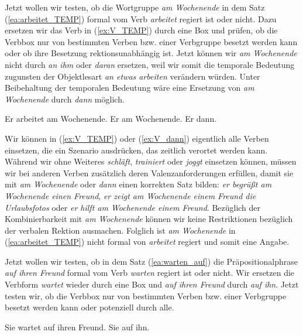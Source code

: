 Jetzt wollen wir testen, ob die Wortgruppe \textit{am Wochenende} in dem Satz (\ref{ea:arbeitet_TEMP}) formal vom Verb \textit{arbeitet} regiert ist oder nicht. Dazu ersetzen wir das Verb in (\ref{ex:V_TEMP}) durch eine Box und prüfen, ob die Verbbox nur von bestimmten Verben bzw. einer Verbgruppe besetzt werden kann oder ob ihre Besetzung rektionsunabhängig ist. Jetzt können wir \textit{am Wochenende} nicht durch \textit{an ihm} oder \textit{daran} ersetzen, weil wir somit die temporale Bedeutung zugunsten der Objektlesart \textit{an etwas arbeiten} verändern würden. Unter Beibehaltung der temporalen Bedeutung wäre eine Ersetzung von \textit{am Wochenende} durch \textit{dann} möglich. 

\ea \label{ea:Subkategorisierungstest2}
\ea \label{ea:arbeitet_TEMP} Er arbeitet am Wochenende.
\ex \label{ex:V_TEMP} Er \fbox{\phantom{arbeitet}} am Wochenende.
\ex \label{ex:V_dann} Er \fbox{\phantom{arbeitet}} dann.
\z 
\z   

Wir können in (\ref{ex:V_TEMP}) oder (\ref{ex:V_dann}) eigentlich alle Verben einsetzen, die ein Szenario ausdrücken, das zeitlich verortet werden kann. Während wir ohne Weiteres \zB \textit{schläft}, \textit{trainiert} oder \textit{joggt} einsetzen können, müssen wir bei anderen Verben zusätzlich deren Valenzanforderungen erfüllen, damit sie mit \textit{am Wochenende} oder \textit{dann} einen korrekten Satz bilden: \zB \textit{er begrüßt am Wochenende einen Freund}, \textit{er zeigt am Wochenende einem Freund die Urlaubsfotos} oder \textit{er hilft am Wochenende einem Freund}. Bezüglich der Kombinierbarkeit mit \textit{am Wochenende} können wir keine Restriktionen bezüglich der verbalen Rektion ausmachen. Folglich ist \textit{am Wochenende} in (\ref{ea:arbeitet_TEMP}) nicht formal von \textit{arbeitet} regiert und somit eine Angabe. 

Jetzt wollen wir testen, ob in dem Satz (\ref{ea:warten_auf}) die Präpositionalphrase \textit{auf ihren Freund} formal vom Verb \textit{warten} regiert ist oder nicht. Wir ersetzen die Verbform \textit{wartet} wieder durch eine Box und \textit{auf ihren Freund} durch \textit{auf ihn}. Jetzt testen wir, ob die Verbbox nur von bestimmten Verben bzw. einer Verbgruppe besetzt werden kann oder potenziell durch alle.

\ea \label{ea:Subkategorisierungstest3}
\ea \label{ea:warten_auf} Sie wartet auf ihren Freund.
\ex \label{ea:Sie_V_auf_ihn} Sie \fbox{\phantom{wartet}} auf ihn.
\z 
\z   

